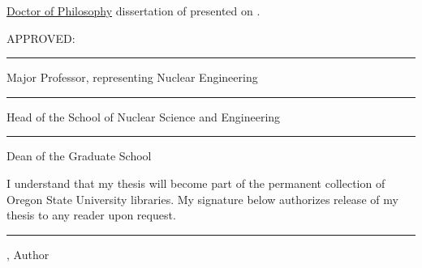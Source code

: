 \documentclass[12pt]{article}
\begin{document}
\singlespacing

\noindent
\underline{Doctor of Philosophy} dissertation of \underline{\ThesisAuthor} presented on \underline{\DefenseDate}.

\vspace{1cm}

\noindent
APPROVED:

\vspace{1cm}


\noindent
\rule{\textwidth}{0.4pt}

\noindent
Major Professor, representing Nuclear Engineering

\vspace{2cm}

\noindent
\rule{\textwidth}{0.4pt}

\noindent
Head of the School of Nuclear Science and Engineering

\vspace{2cm}

\noindent
\rule{\textwidth}{0.4pt}

\noindent
Dean of the Graduate School

\vspace{3cm}

\noindent
I understand that my thesis will become part of the permanent collection of Oregon State University libraries. My signature below authorizes release of my thesis to any reader upon request.

\vspace{2cm}

\noindent
\rule{\textwidth}{0.4pt}

\noindent
\centering \ThesisAuthor, Author
\end{document}
